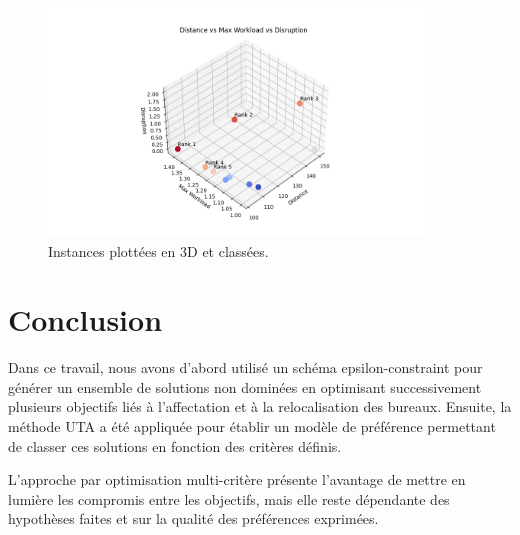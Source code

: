 \documentclass[12pt,a4paper]{article}
\begin{document}
\begin{figure}[H]
    \centering
    \includegraphics[width=0.9\textwidth]{figures/step4_uta_ranking.png}
    \caption{Instances plottées en 3D et classées.}
    \label{fig:uta_ranking}
\end{figure}


\section*{Conclusion}

Dans ce travail, nous avons d'abord utilisé un schéma epsilon-constraint pour générer un ensemble de solutions non dominées en optimisant successivement plusieurs objectifs liés à l'affectation et à la relocalisation des bureaux. Ensuite, la méthode UTA a été appliquée pour établir un modèle de préférence permettant de classer ces solutions en fonction des critères définis.

L'approche par optimisation multi-critère présente l'avantage de mettre en lumière les compromis entre les objectifs, mais elle reste dépendante des hypothèses faites et sur la qualité des préférences exprimées. 
\end{document}
